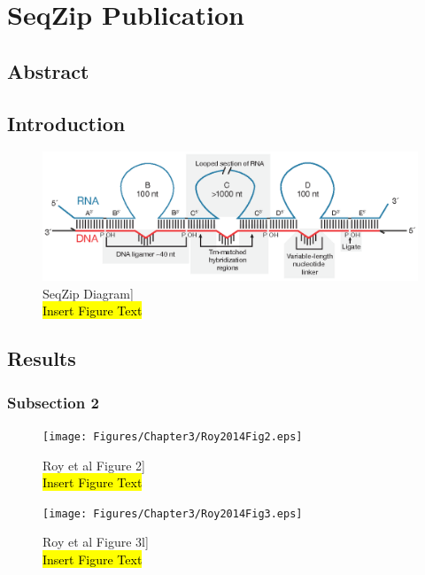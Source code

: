 \chapter{SeqZip Publication} 
\label{Chapter3} 
\section{Abstract}\label{c1sec: Abstract}

\section{Introduction}\label{c3sec: Introduction}

	\begin{figure}[htbp] %
		\centering 
		\includegraphics{Figures/Chapter3/Roy2014Fig1.eps}
		\caption[SeqZip Diagram]
		{
			SeqZip Diagram]\\
			\hl{Insert Figure Text}
			}
		\label{fig:Roy2014 F1}
		\end{figure}

\section{Results}\label{c3sec: Results}

	\subsection{Subsection 2}

		\begin{figure}[htbp] %
			\centering 
			\texttt{[image: Figures/Chapter3/Roy2014Fig2.eps]}
			\caption[SeqZip Diagram]
			{
				Roy et al Figure 2]\\
				\hl{Insert Figure Text}
				}
			\label{fig:Roy2014 F2}
			\end{figure}

		\begin{figure}[htbp] %
			\centering 
			\texttt{[image: Figures/Chapter3/Roy2014Fig3.eps]}
			\caption[SeqZip Diagram]
			{
				Roy et al Figure 3l]\\
				\hl{Insert Figure Text}
				}
			\label{fig:Roy2014 F3}
			\end{figure}

